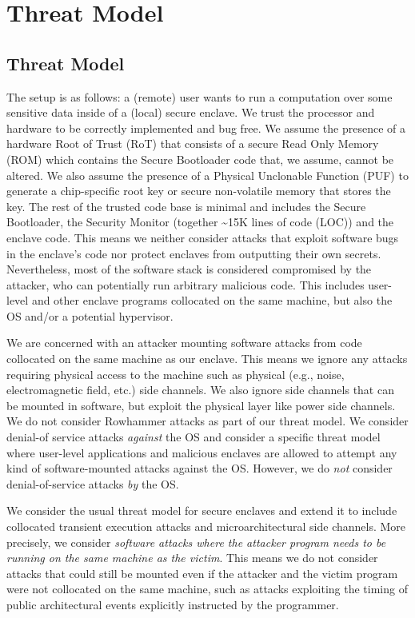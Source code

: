 \section{Threat Model}

\subsection{Threat Model}
\label{sec:threadmodel}

The setup is as follows:
a (remote)
user wants to run a computation over some sensitive data inside of a (local) secure enclave.
We trust the processor and hardware to be correctly implemented and bug free.
We assume the presence of a hardware Root of Trust (RoT) that consists of a secure Read Only Memory (ROM) which contains the Secure Bootloader code that, we assume, cannot be altered.
We also assume the presence of a Physical Unclonable Function (PUF) \cite{herder2014physical} to generate a chip-specific root key or secure non-volatile memory that stores the key.
The rest of the trusted code base is minimal and includes the Secure Bootloader, the Security Monitor (together \textasciitilde15K lines of code (LOC)) and the enclave code.
This means we neither consider attacks that exploit software bugs in the enclave's code nor protect enclaves from outputting their own secrets.
Nevertheless, most of the software stack is considered compromised by the attacker, who can potentially run arbitrary malicious code.
This includes user-level and other enclave programs collocated on the same machine, but also the OS and/or a potential hypervisor.

We are concerned with an attacker mounting software attacks from code collocated on the same machine as our enclave.
This means we ignore any attacks requiring physical access to the machine such as physical (e.g., noise, electromagnetic field, etc.) side channels. 
We also ignore side channels that can be mounted in software, but exploit the physical layer like power side channels.
We do not consider Rowhammer attacks as part of our threat model.
We consider denial-of service attacks \textit{against} the OS and consider a specific threat model where user-level applications and malicious enclaves are allowed to attempt any kind of software-mounted attacks against the OS. However, we do \textit{not} consider denial-of-service attacks \textit{by} the OS.

We consider the usual threat model for secure enclaves and extend it to include collocated transient execution attacks and microarchitectural side channels.
More precisely, we consider \emph{software attacks where the attacker program needs to be running on the same machine as the victim}. 
This means we do not consider attacks that could still be mounted even if the attacker and the victim program were not collocated on the same machine, such as attacks exploiting the timing of public architectural events explicitly instructed by the programmer.

